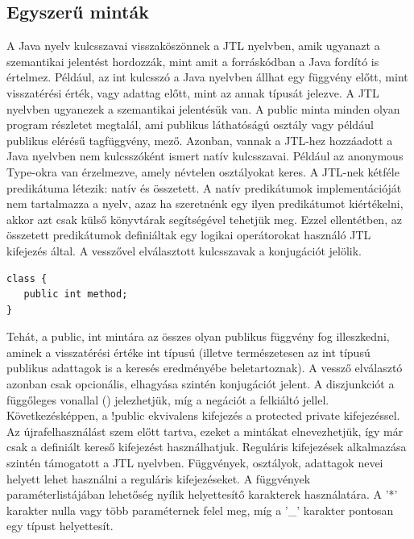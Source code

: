 \documentclass[a4paper,12pt]{report}
\begin{document}
\subsection{Egyszerű minták}
\par A Java nyelv kulcsszavai visszaköszönnek a JTL nyelvben, amik ugyanazt a szemantikai jelentést hordozzák, mint amit a forráskódban a Java fordító is értelmez. Például, az int kulcsszó a Java nyelvben állhat egy függvény előtt, mint visszatérési érték, vagy adattag előtt, mint az annak típusát jelezve. A JTL nyelvben ugyanezek a szemantikai jelentésük van. A public minta minden olyan program részletet megtalál, ami publikus láthatóságú osztály vagy például publikus elérésű tagfüggvény, mező. Azonban, vannak a JTL-hez hozzáadott a Java nyelvben nem kulcsszóként ismert natív kulcsszavai. Például az anonymous Type-okra van érzelmezve, amely névtelen osztályokat keres. A JTL-nek kétféle predikátuma létezik: natív és összetett. A natív predikátumok implementációját nem tartalmazza a nyelv, azaz ha szeretnénk egy ilyen predikátumot kiértékelni, akkor azt csak külső könyvtárak segítségével tehetjük meg. Ezzel ellentétben, az összetett predikátumok definiáltak egy logikai operátorokat használó JTL kifejezés által. A vesszővel elválasztott kulcsszavak a konjugációt jelölik. 
\begin{verbatim}
class {
   public int method;
}
\end{verbatim}
Tehát, a public, int mintára az összes olyan publikus függvény fog illeszkedni, aminek a visszatérési értéke int típusú (illetve természetesen az int típusú publikus adattagok is a keresés eredményébe beletartoznak). A vessző elválasztó azonban csak opcionális, elhagyása szintén konjugációt jelent. A diszjunkciót a függőleges vonallal (\textpipe) jelezhetjük, míg a negációt a felkiáltó jellel. Következésképpen, a !public ekvivalens kifejezés a protected \textpipe private  kifejezéssel. Az újrafelhasználást szem előtt tartva, ezeket a mintákat elnevezhetjük, így már csak a definiált kereső kifejezést használhatjuk. Reguláris kifejezések alkalmazása szintén támogatott a JTL nyelvben. Függvények, osztályok, adattagok nevei helyett lehet használni a reguláris kifejezéseket. A függvények paraméterlistájában lehetőség nyílik helyettesítő karakterek használatára. A ’*’ karakter nulla vagy több paraméternek felel meg, míg a ’\_’ karakter pontosan egy típust helyettesít.
\end{document}
